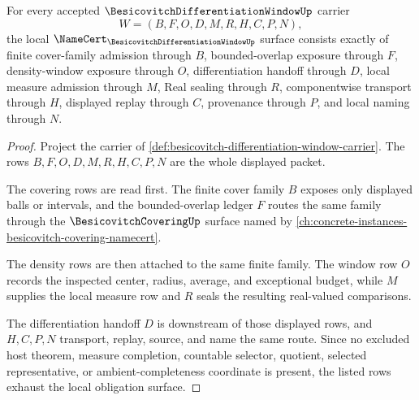 \begin{theorem}
\label{thm:besicovitch-differentiation-window-namecert-obligations}
For every accepted $\BesicovitchDifferentiationWindowUp$ carrier
$$
W=(B,F,O,D,M,R,H,C,P,N),
$$
the local $\NameCert_{\BesicovitchDifferentiationWindowUp}$ surface consists exactly of finite cover-family admission through $B$, bounded-overlap exposure through $F$, density-window exposure through $O$, differentiation handoff through $D$, local measure admission through $M$, Real sealing through $R$, componentwise transport through $H$, displayed replay through $C$, provenance through $P$, and local naming through $N$.
\end{theorem}
\begin{proof}
Project the carrier of \autoref{def:besicovitch-differentiation-window-carrier}. The rows $B,F,O,D,M,R,H,C,P,N$ are the whole displayed packet.

The covering rows are read first. The finite cover family $B$ exposes only displayed balls or intervals, and the bounded-overlap ledger $F$ routes the same family through the $\BesicovitchCoveringUp$ surface named by \autoref{ch:concrete-instances-besicovitch-covering-namecert}.

The density rows are then attached to the same finite family. The window row $O$ records the inspected center, radius, average, and exceptional budget, while $M$ supplies the local measure row and $R$ seals the resulting real-valued comparisons.

The differentiation handoff $D$ is downstream of those displayed rows, and $H,C,P,N$ transport, replay, source, and name the same route. Since no excluded host theorem, measure completion, countable selector, quotient, selected representative, or ambient-completeness coordinate is present, the listed rows exhaust the local obligation surface.
\end{proof}

